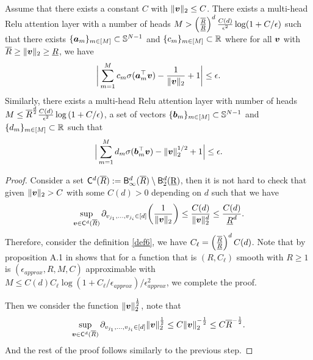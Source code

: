     \begin{lemma}\label{reluapprox}
    Assume that there exists a constant $C$ with $\Vert\boldsymbol{v}\Vert_2\leq C$. There exists a multi-head Relu attention layer with a number of heads $M>\left(\frac{\overline R}{\underline R}\right)^d\frac{C(d)}{\epsilon^2}\log(1+C/\epsilon)$ such that there exists $\{\boldsymbol{a}_m\}_{m\in[M]}\subset\mathbb{S}^{N-1}$ and $\{c_m\}_{m\in[M]}\subset\mathbb{R}$ where for all $\boldsymbol{v}$ with $\overline R\geq\Vert\boldsymbol{v}\Vert_2\geq \underline R$, we have 
    \begin{align*}
        \bigg|\sum_{m=1}^Mc_m\sigma(\boldsymbol{a}_m^\top\boldsymbol{v})-\frac{1}{\Vert\boldsymbol{v}\Vert_2}+1\bigg|\leq\epsilon.
    \end{align*}
    Similarly, there exists a multi-head Relu attention layer with number of heads $M\leq\overline R^{\frac{d}{2}}\frac{C(d)}{\epsilon^2}\log\left(1+C/\epsilon\right)$, a set of vectors $\{\boldsymbol{b}_m\}_{m\in[M]}\subset\mathbb{S}^{N-1}$ and $\{d_m\}_{m\in[M]}\subset\mathbb{R}$ such that 
    \begin{align*}
        \Big|\sum_{m=1}^Md_m\sigma(\boldsymbol{b}_m^\top\boldsymbol{v})-\Vert\boldsymbol{v}\Vert_2^{1/2}+1\Big|\leq\epsilon.
    \end{align*}
\end{lemma}


\begin{proof}
    Consider a set $\mathsf{C}^d(\overline R) :=\mathsf{B}^d_{\infty}(\overline R)\setminus\mathsf{B}_{2}^d(\underbar R)$, then it is not hard to check that given $\Vert\boldsymbol{v}\Vert_2>C$ with some $C(d)>0$ depending on $d$ such that we have
    \begin{align*}
        \sup_{\boldsymbol{v}\in\mathsf{C}^d(\overline R)}\partial_{v_{j_1},\ldots,v_{j_i}\in[d]}{\bigg (}\frac{1}{\Vert\boldsymbol{v}\Vert_2}{\bigg )}\leq\frac{C(d)}{\Vert\boldsymbol{v}\Vert_2^d}\leq\frac{C(d)}{\underline R^d}.
    \end{align*}
    Therefore, consider the definition \ref{def6}, we have $C_{\ell}=\left(\frac{\overline R}{\underline R}\right)^d C(d)$.  Note that by proposition A.1 in \citep{bai2024transformers} shows that for a function that is $(R,C_{\ell})$ smooth with $R\geq 1$ is $(\epsilon_{approx}, R, M,C)$ approximable with $M\leq C(d)C_{\ell}\log(1+C_{\ell}/\epsilon_{approx})/\epsilon_{approx}^2$, we complete the proof. 

    Then we consider the function $\Vert\boldsymbol{v}\Vert_2^{\frac{1}{2}}$, note that
    \begin{align*}
        \sup_{\boldsymbol{v}\in\mathsf{C}^d(\overline R)}\partial_{v_{j_1},\ldots,v_{j_i}\in[d]}\Vert\boldsymbol{v}\Vert_2^{\frac{1}{2}}\leq C\Vert\boldsymbol{v}\Vert_2^{-\frac{1}{2}}\leq C\overline R^{-\frac{1}{2}}.
    \end{align*}
    And the rest of the proof follows similarly to the previous step.
\end{proof}

